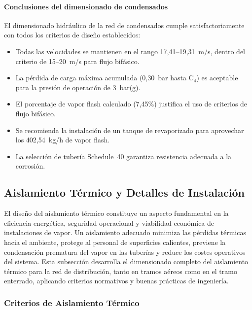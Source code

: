 \paragraph{Conclusiones del dimensionado de condensados}

El dimensionado hidráulico de la red de condensados cumple satisfactoriamente con todos los criterios de diseño establecidos:

\begin{itemize}[noitemsep]
	\item Todas las velocidades se mantienen en el rango 17{,}41--19{,}31~m/s, dentro del criterio de 15--20~m/s para flujo bifásico.
	\item La pérdida de carga máxima acumulada (0{,}30~bar hasta C$_4$) es aceptable para la presión de operación de 3~bar(g).
	\item El porcentaje de vapor flash calculado (7{,}45\%) justifica el uso de criterios de flujo bifásico.
	\item Se recomienda la instalación de un tanque de revaporizado para aprovechar los 402{,}54~kg/h de vapor flash.
	\item La selección de tubería Schedule~40 garantiza resistencia adecuada a la corrosión.
\end{itemize}



\subsection{Aislamiento Térmico y Detalles de Instalación}
\label{subsec:aislamiento_termico}

El diseño del aislamiento térmico constituye un aspecto fundamental en la eficiencia energética, seguridad operacional y viabilidad económica de instalaciones de vapor. Un aislamiento adecuado minimiza las pérdidas térmicas hacia el ambiente, protege al personal de superficies calientes, previene la condensación prematura del vapor en las tuberías y reduce los costes operativos del sistema. Esta subsección desarrolla el dimensionado completo del aislamiento térmico para la red de distribución, tanto en tramos aéreos como en el tramo enterrado, aplicando criterios normativos y buenas prácticas de ingeniería.


\subsubsection{Criterios de Aislamiento Térmico}
\label{subsubsec:criterios_aislamiento}

